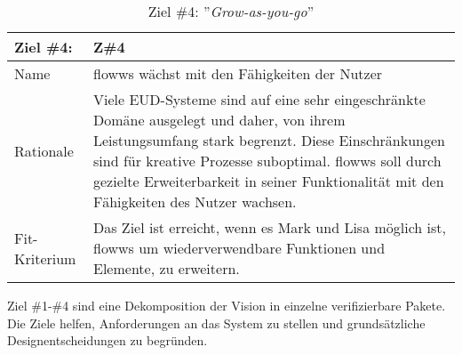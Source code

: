 \begin{table}[H]
\caption{Ziel \#4: ''\textit{Grow-as-you-go}''}
\label{tab:ziel4}
\begin{tabularx}{\textwidth}{lX}
\hline
\rowcolor[HTML]{EFEFEF} 
Ziel \#4:     & Z\#4 \\ \hline
Name          & flowws wächst mit den Fähigkeiten der Nutzer \\ \hline
Rationale     & Viele \ac{EUD}-Systeme sind auf eine sehr eingeschränkte Domäne ausgelegt und daher, von ihrem Leistungsumfang stark begrenzt. Diese Einschränkungen sind für kreative Prozesse suboptimal. flowws soll durch gezielte Erweiterbarkeit in seiner Funktionalität mit den Fähigkeiten des Nutzer wachsen. \\ \hline
Fit-Kriterium & Das Ziel ist erreicht, wenn es Mark und Lisa möglich ist, flowws um wiederverwendbare Funktionen und Elemente, zu erweitern.  \\ \hline
\end{tabularx}
\end{table}

Ziel \#1-\#4 sind eine Dekomposition der Vision in einzelne verifizierbare Pakete. Die Ziele helfen, Anforderungen an das System zu stellen und grundsätzliche Designentscheidungen zu begründen.

